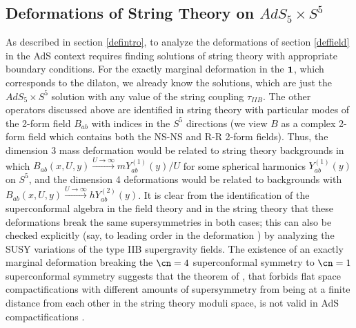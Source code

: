  \subsection{Deformations of String Theory on $AdS_5\times S^5$}
 \label{defstring}

 As described in section \ref{defintro}, to analyze the deformations
 of section \ref{deffield} in the AdS context requires finding
 solutions of string theory with appropriate boundary conditions. For
 the exactly marginal deformation in the $\bf 1$, which corresponds to
 the dilaton, we already know the solutions, which are just the
 $AdS_5\times S^5$ solution with any value of the string coupling
 $\tau_{IIB}$. The other operators discussed above are identified in
 string theory with particular modes of the 2-form field $B_{ab}$ with
 indices in the $S^5$ directions (we view $B$ as a complex 2-form
 field which contains both the NS-NS and R-R 2-form fields). Thus, the
 dimension 3 mass deformation would be related to string theory
 backgrounds in which $B_{ab}(x,U,y) \stackrel{U\to
 \infty}{\longrightarrow} m Y_{ab}^{(1)}(y) / U$ for some spherical
 harmonics $Y_{ab}^{(1)}(y)$ on $S^5$, and the dimension 4
 deformations would be related to backgrounds with $B_{ab}(x,U,y)
 \stackrel{U\to \infty}{\longrightarrow} h Y_{ab}^{(2)}(y)$. It is
 clear from the identification of the superconformal algebra in the
 field theory and in the string theory that these deformations break
 the same supersymmetries in both cases; this can also be checked
 explicitly (say, to leading order in the deformation
 \cite{aks_unpublished,Girardello:1998pd}) by analyzing the SUSY
 variations of the type IIB supergravity fields. The existence of an
 exactly marginal deformation breaking the $\cn=4$ superconformal
 symmetry to $\cn=1$ superconformal symmetry suggests that the theorem
 of \cite{Banks:1988yz}, that forbids flat space compactifications
 with different amounts of supersymmetry from being at a finite
 distance from each other in the string theory moduli space, is not
 valid in AdS compactifications
 \cite{aks_unpublished,Girardello:1998pd}.

